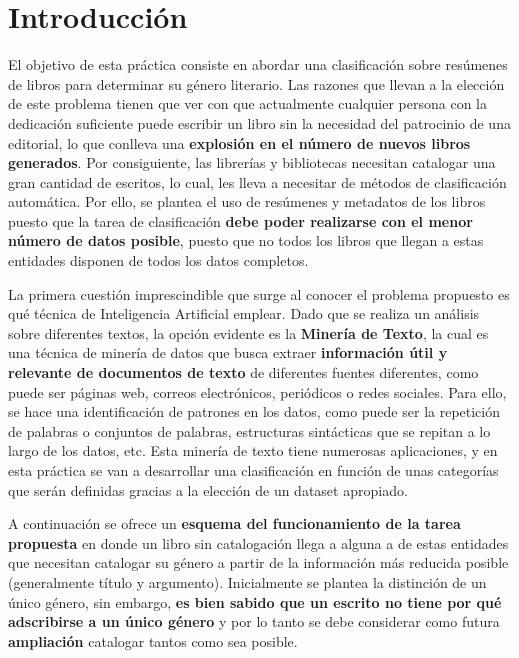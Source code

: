 \documentclass[12pt,a4paper, xcolor=table]{article}
\begin{document}
\section{Introducción}

El objetivo de esta práctica consiste en abordar una clasificación sobre resúmenes de libros para determinar su género literario. Las razones que llevan a la elección de este problema tienen que ver con que actualmente cualquier persona con la dedicación suficiente puede escribir un libro sin la necesidad del patrocinio de una editorial, lo que conlleva una \textbf{explosión en el número de nuevos libros generados}. Por consiguiente, las librerías y bibliotecas necesitan catalogar una gran cantidad de escritos, lo cual, les lleva a necesitar de métodos de clasificación automática. Por ello, se plantea el uso de resúmenes y metadatos de los libros puesto que la tarea de clasificación \textbf{debe poder realizarse con el menor número de datos posible}, puesto que no todos los libros que llegan a estas entidades disponen de todos los datos completos.

\vspace{3mm}

La primera cuestión imprescindible que surge al conocer el problema propuesto es qué técnica de Inteligencia Artificial emplear. Dado que se realiza un análisis sobre diferentes textos, la opción evidente es la \textbf{Minería de Texto}, la cual es una técnica de minería de datos que busca extraer \textbf{información útil y relevante de documentos de texto} de diferentes fuentes diferentes, como puede ser páginas web,
correos electrónicos, periódicos o redes sociales. Para ello, se hace una identificación de patrones en los datos, como puede ser la repetición de palabras o conjuntos de palabras, estructuras sintácticas que se repitan a lo largo de los datos, etc. Esta minería de texto tiene numerosas aplicaciones, y en esta práctica se van a desarrollar una clasificación en función de unas categorías que serán definidas gracias a la elección de un dataset apropiado.

\vspace{3mm}

A continuación se ofrece un\textbf{ esquema del funcionamiento de la tarea propuesta }en donde un libro sin catalogación llega a alguna a de estas entidades que necesitan catalogar su género a partir de la información más reducida posible (generalmente título y argumento). Inicialmente se plantea la distinción de un único género, sin embargo, \textbf{es bien sabido que un escrito no tiene por qué adscribirse a un único género} y por lo tanto se debe considerar como futura \textbf{ampliación} catalogar tantos como sea posible.
\end{document}
